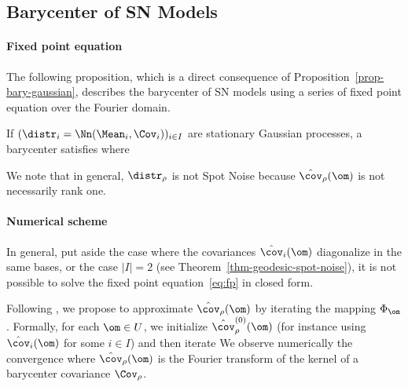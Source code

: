 \subsection{Barycenter of SN Models}

\paragraph{Fixed point equation}

The following proposition, which is a direct consequence of Proposition~\ref{prop-bary-gaussian}, describes the barycenter of SN models using a series of fixed point equation over the Fourier domain.

\begin{proposition}
	If $(\distr_i = \Nn(\Mean_i,\Cov_i))_{i \in I}$ are stationary Gaussian processes, a barycenter satisfies
	where
\end{proposition}


We note that in general, $\distr_\rho$ is not Spot Noise because $\hat\cov_\rho(\om)$ is not necessarily rank one.

\paragraph{Numerical scheme}

In general, put aside the case where the covariances $\hat \cov_i(\om)$ diagonalize in the same bases, or the case $|I|=2$ (see Theorem~\ref{thm-geodesic-spot-noise}), it is not possible to solve the fixed point equation~\eqref{eq:fp} in closed form. 

Following \cite{knott-barycenter-gaussian}, we propose to approximate $\hat \cov_\rho(\om)$ by iterating the mapping $\Phi_\om$. Formally, for each $\om \in U$, we initialize $\hat \cov_\rho^{(0)}(\om)$ (for instance using $\hat \cov_i(\om)$ for some $i \in I$) and then iterate
We observe numerically the convergence 
\eq{
	\hat \cov_\rho^{(\ell)}(\om) \overset{\ell \rightarrow +\infty}{\longrightarrow}
	\hat \cov_\rho(\om)
}
where $\hat \cov_\rho(\om)$ is the Fourier transform of the kernel of a barycenter covariance $\Cov_\rho$.


